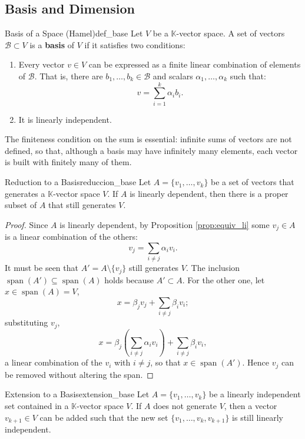 \documentclass[11pt, a4paper]{article}
\begin{document}
\subsection{Basis and Dimension}

\begin{definicion}{Basis of a Space (Hamel)}{def_base}
Let $V$ be a $\mathbb{K}$-vector space. A set of vectors $\mathcal{B} \subset V$ is a \textbf{basis} of $V$ if it satisfies two conditions:
\begin{enumerate}
    \item Every vector $v \in V$ can be expressed as a finite linear combination of elements of $\mathcal{B}$.
    That is, there are $b_1, \dots, b_k \in \mathcal{B}$ and scalars $\alpha_1, \dots, \alpha_k$ such that:
    \[ v = \sum_{i=1}^k \alpha_i b_i. \]
    \item It is linearly independent.
\end{enumerate}
\end{definicion}

\obs The finiteness condition on the sum is essential: infinite sums of vectors are not defined, so that, although a basis may have infinitely many elements, each vector is built with finitely many of them.

\begin{proposicion}{Reduction to a Basis}{reduccion_base}
Let $A = \{v_1, \dots, v_k\}$ be a set of vectors that generates a $\mathbb{K}$-vector space $V$. If $A$ is linearly dependent, then there is a proper subset of $A$ that still generates $V$.
\end{proposicion}

\begin{proof}
Since $A$ is linearly dependent, by Proposition \ref{prop:equiv_li} some $v_j \in A$ is a linear combination of the others:
\[
v_j = \sum_{i \neq j} \alpha_i v_i.
\]
It must be seen that $A' = A \setminus \{v_j\}$ still generates $V$. The inclusion $\operatorname{span}(A') \subseteq \operatorname{span}(A)$ holds because $A' \subset A$. For the other one, let $x \in \operatorname{span}(A) = V$,
\[
x = \beta_j v_j + \sum_{i \neq j} \beta_i v_i;
\]
substituting $v_j$,
\[
x = \beta_j \left( \sum_{i \neq j} \alpha_i v_i \right) + \sum_{i \neq j} \beta_i v_i,
\]
a linear combination of the $v_i$ with $i \neq j$, so that $x \in \operatorname{span}(A')$. Hence $v_j$ can be removed without altering the span.
\end{proof}

\begin{proposicion}{Extension to a Basis}{extension_base}
Let $A = \{v_1, \dots, v_k\}$ be a linearly independent set contained in a $\mathbb{K}$-vector space $V$. If $A$ does not generate $V$, then a vector $v_{k+1} \in V$ can be added such that the new set $\{v_1, \dots, v_k, v_{k+1}\}$ is still linearly independent.
\end{proposicion}
\end{document}
